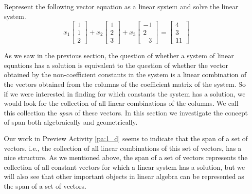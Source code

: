 \begin{activity}
	\item Represent the following vector equation as a linear system and solve the linear system.
\[x_1 \left[ \begin{array}{c} 1 \\ 1 \\ 2 \end{array} \right] +x_2 \left[ \begin{array}{c} 1 \\ 2\\ 3 \end{array} \right] + x_3 \left[ \begin{array}{r} -1 \\ 2 \\ -3 \end{array} \right] = \left[ \begin{array}{c} 4 \\ 3\\ 11 \end{array} \right] \]


\begin{comment}

This system is the same as the system in the second problem of Preview Activity \ref{pa:1_b}.

\end{comment}

	\ea
\end{activity}



As we saw in the previous section, the question of whether a system of linear equations has a solution is equivalent to the question of whether the vector obtained by the non-coefficient constants in the system is a linear combination of the vectors obtained from the columns of the coefficient matrix of the system. So if we were interested in finding for which constants the system has a solution, we would look for the collection of all linear combinations of the columns. We call this collection the \emph{span} of these vectors. In this section we investigate the concept of span both algebraically and geometrically.

Our work in Preview Activity \ref{pa:1_d} seems to indicate that the span of a set of vectors, i.e., the collection of all linear combinations of this set of vectors, has a nice structure. As we mentioned above, the span of a set of vectors represents the collection of all constant vectors for which a linear system has a solution, but we will also see that other important objects in linear algebra can be represented as the span of a set of vectors.




